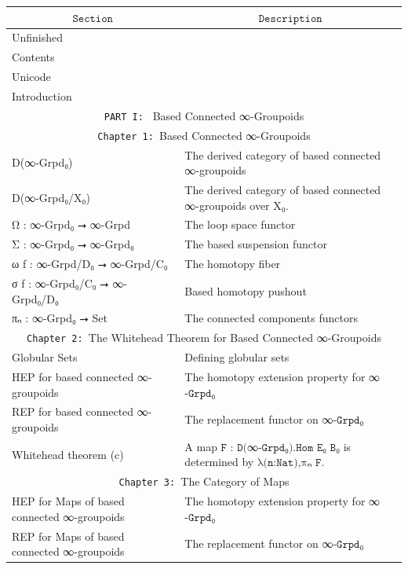 \documentclass{book}
\theoremstyle{definition}
\begin{document}
{
\footnotesize
\begin{longtable}{|| l || l ||} 
\hline
\multicolumn{1}{||c||}{$\texttt{Section}$} & \multicolumn{1}{|c||}{$\texttt{Description}$} \\
\hline
\hline
Unfinished & \\
\hline
Contents & \\
\hline
Unicode & \\
\hline
Introduction & \\
\hline \hline
\multicolumn{2}{||c||}{\texttt{PART I: } Based Connected ∞-Groupoids} \\
\hline \hline
\multicolumn{2}{||c||}{\texttt{Chapter 1: }Based Connected ∞-Groupoids} \\
\hline \hline
D(∞-Grpd₀) & The derived category of based connected ∞-groupoids \\
\hline
D(∞-Grpd₀/X₀) & The derived category of based connected ∞-groupoids over X₀. \\
\hline
Ω : ∞-Grpd₀ ⭢ ∞-Grpd & The loop space functor \\
\hline
Σ : ∞-Grpd₀ ⭢ ∞-Grpd₀ & The based suspension functor \\
\hline 
ω f : ∞-Grpd/D₀ ⭢ ∞-Grpd/C₀ & The homotopy fiber\\
\hline 
σ f : ∞-Grpd₀/C₀ ⭢ ∞-Grpd₀/D₀ & Based homotopy pushout \\
 \hline 
πₙ : ∞-Grpd₀ ⭢ Set & The connected components functors\\
 \hline \hline
  \multicolumn{2}{||c||}{\texttt{Chapter 2: }The Whitehead Theorem for Based Connected ∞-Groupoids} \\
\hline \hline
Globular Sets & Defining globular sets\\
\hline
HEP for based connected ∞-groupoids & The homotopy extension property for ∞$\texttt{-Grpd}$₀\\
 \hline 
REP for based connected ∞-groupoids & The replacement functor on ∞$\texttt{-Grpd}$₀ \\
\hline
Whitehead theorem (c) & A map $\texttt{F : D(}$∞$\texttt{-Grpd₀).Hom E₀ B₀}$ is determined by $\texttt{λ(n:Nat),πₙ F}$. \\
\hline \hline
  \multicolumn{2}{||c||}{\texttt{Chapter 3: }The Category of Maps} \\
\hline \hline
HEP for Maps of based connected ∞-groupoids & The homotopy extension property for ∞$\texttt{-Grpd}$₀\\
 \hline 
REP for Maps of based connected ∞-groupoids & The replacement functor on ∞$\texttt{-Grpd}$₀ \\

\end{longtable}}
\end{document}
